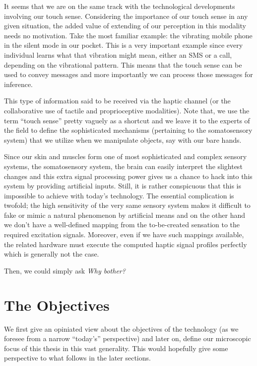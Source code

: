 It seems that we are on the same track with the technological developments involving our touch sense. Considering the importance of our touch sense in any given situation, the added value of extending of our perception in this modality needs no motivation. Take the most familiar example: the vibrating mobile phone in the silent mode in our pocket. This is a very important example since every individual learns what that vibration might mean, either an SMS or a call, depending on the vibrational pattern. This means that the touch sense can be used to convey messages and more importantly we can process those messages for inference. 


This type of information said to be received via the haptic channel (or the collaborative use of tactile and proprioceptive modalities). Note that, we use the term ``touch sense'' pretty vaguely as a shortcut and we leave it to the experts of the field to define the sophisticated mechanisms (pertaining to the somatosensory system) that we utilize when we manipulate objects, say with our bare hands. 


Since our skin and muscles form one of most sophisticated and complex sensory systems, the somatosensory system, the brain can easily interpret the slightest changes and this extra signal processing power gives us a chance to hack into this system by providing artificial inputs. Still, it is rather conspicuous that this is impossible to achieve with today's technology. The essential complication is twofold; the high sensitivity of the very same sensory system makes it difficult to fake or mimic a natural phenomenon by artificial means and on the other hand we don't have a well-defined mapping from the to-be-created sensation to the required excitation signals. Moreover, even if we have such mappings available, the related hardware must execute the computed haptic signal profiles perfectly which is generally not the case.

Then, we could simply ask \emph{Why bother?} 


\section{The Objectives}

We first give an opiniated view about the objectives of the technology (as we foresee from a narrow ``today's'' perspective) and later on, define our microscopic focus of this thesis in this vast generality. This would hopefully give some perspective to what follows in the later sections.  


